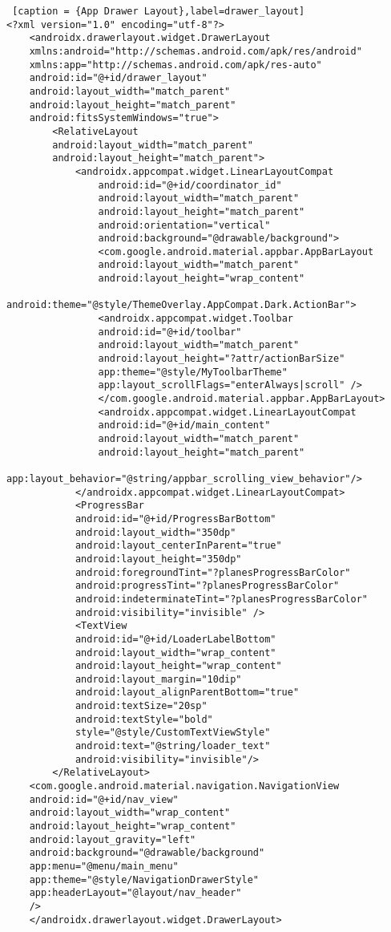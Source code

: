 \begin{lstlisting} [caption = {App Drawer Layout},label=drawer_layout]
<?xml version="1.0" encoding="utf-8"?>
	<androidx.drawerlayout.widget.DrawerLayout
	xmlns:android="http://schemas.android.com/apk/res/android"
	xmlns:app="http://schemas.android.com/apk/res-auto"
	android:id="@+id/drawer_layout"
	android:layout_width="match_parent"
	android:layout_height="match_parent"
	android:fitsSystemWindows="true">
		<RelativeLayout
		android:layout_width="match_parent"
		android:layout_height="match_parent">
			<androidx.appcompat.widget.LinearLayoutCompat
				android:id="@+id/coordinator_id"
				android:layout_width="match_parent"
				android:layout_height="match_parent"
				android:orientation="vertical"
				android:background="@drawable/background">
				<com.google.android.material.appbar.AppBarLayout
				android:layout_width="match_parent"
				android:layout_height="wrap_content"
				android:theme="@style/ThemeOverlay.AppCompat.Dark.ActionBar">
				<androidx.appcompat.widget.Toolbar
				android:id="@+id/toolbar"
				android:layout_width="match_parent"
				android:layout_height="?attr/actionBarSize"
				app:theme="@style/MyToolbarTheme"
				app:layout_scrollFlags="enterAlways|scroll" />
				</com.google.android.material.appbar.AppBarLayout>
				<androidx.appcompat.widget.LinearLayoutCompat
				android:id="@+id/main_content"
				android:layout_width="match_parent"
				android:layout_height="match_parent"
				app:layout_behavior="@string/appbar_scrolling_view_behavior"/>
			</androidx.appcompat.widget.LinearLayoutCompat>
			<ProgressBar
			android:id="@+id/ProgressBarBottom"
			android:layout_width="350dp"
			android:layout_centerInParent="true"
			android:layout_height="350dp"
			android:foregroundTint="?planesProgressBarColor"
			android:progressTint="?planesProgressBarColor"
			android:indeterminateTint="?planesProgressBarColor"
			android:visibility="invisible" />
			<TextView
			android:id="@+id/LoaderLabelBottom"
			android:layout_width="wrap_content"
			android:layout_height="wrap_content"
			android:layout_margin="10dip"
			android:layout_alignParentBottom="true"
			android:textSize="20sp"
			android:textStyle="bold"
			style="@style/CustomTextViewStyle"
			android:text="@string/loader_text"
			android:visibility="invisible"/>
		</RelativeLayout>
	<com.google.android.material.navigation.NavigationView
	android:id="@+id/nav_view"
	android:layout_width="wrap_content"
	android:layout_height="wrap_content"
	android:layout_gravity="left"
	android:background="@drawable/background"
	app:menu="@menu/main_menu"
	app:theme="@style/NavigationDrawerStyle"
	app:headerLayout="@layout/nav_header"
	/>
	</androidx.drawerlayout.widget.DrawerLayout>
\end{lstlisting}
 
